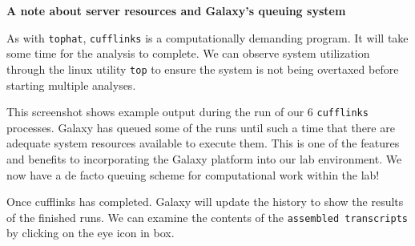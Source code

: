 \documentclass[a4paper,10pt]{article}
\begin{document}
\begin{lrbox}{\topbox}
\begin{minipage}[c][][c]{.98\textwidth}
\textbf{A note about server resources and Galaxy's queuing system}\vspace{1em}

As with \texttt{\footnotesize{tophat}}, \texttt{\footnotesize{cufflinks}} is a computationally demanding program.  It will take some time for the analysis to complete.  We can observe system utilization through the linux utility \texttt{\footnotesize{top}} to ensure the system is not being overtaxed before starting multiple analyses.\vspace{1em}

This screenshot shows example output during the run of our 6 \texttt{\footnotesize{cufflinks}} processes.  Galaxy has queued some of the runs until such a time that there are adequate system resources available to execute them.  This is one of the features and benefits to incorporating the Galaxy platform into our lab environment.  We now have a de facto queuing scheme for computational work within the lab!\vspace{1em}
\setlength\fboxsep{0pt}
\end{minipage}
\end{lrbox}

Once cufflinks has completed.  Galaxy will update the history to show the results of the finished runs.  We can examine the contents of the \texttt{\footnotesize{assembled transcripts}} by clicking on the eye icon in box.\vspace{1em}\\
\setlength\fboxsep{0pt}
\end{document}
